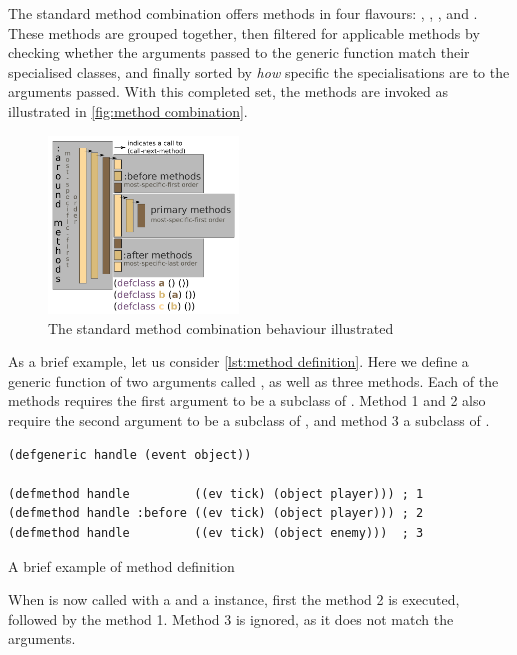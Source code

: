 \documentclass[a4paper]{paper}
\begin{document}
The standard method combination offers methods in four flavours: , , , and . These methods are grouped together, then filtered for applicable methods by checking whether the arguments passed to the generic function match their specialised classes, and finally sorted by \textit{how} specific the specialisations are to the arguments passed. With this completed set, the methods are invoked as illustrated in \autoref{fig:method combination}.

\begin{figure}[h]
  \centering
  \includegraphics[width=0.45\textwidth]{method combination.png}
  \caption{The standard method combination behaviour illustrated}
  \label{fig:method combination}
\end{figure}

As a brief example, let us consider \autoref{lst:method definition}. Here we define a generic function of two arguments called , as well as three methods. Each of the methods requires the first argument to be a subclass of . Method 1 and 2 also require the second argument to be a subclass of , and method 3 a subclass of .

\begin{listing}[h]
\begin{verbatim}
(defgeneric handle (event object))

(defmethod handle         ((ev tick) (object player))) ; 1
(defmethod handle :before ((ev tick) (object player))) ; 2
(defmethod handle         ((ev tick) (object enemy)))  ; 3
\end{verbatim}
\caption{A brief example of method definition}
\label{lst:method definition}
\end{listing}

\hypertarget{first-call}{When  is now called with a  and a  instance, first the method 2 is executed, followed by the method 1. Method 3 is ignored, as it does not match the arguments.}
\end{document}
